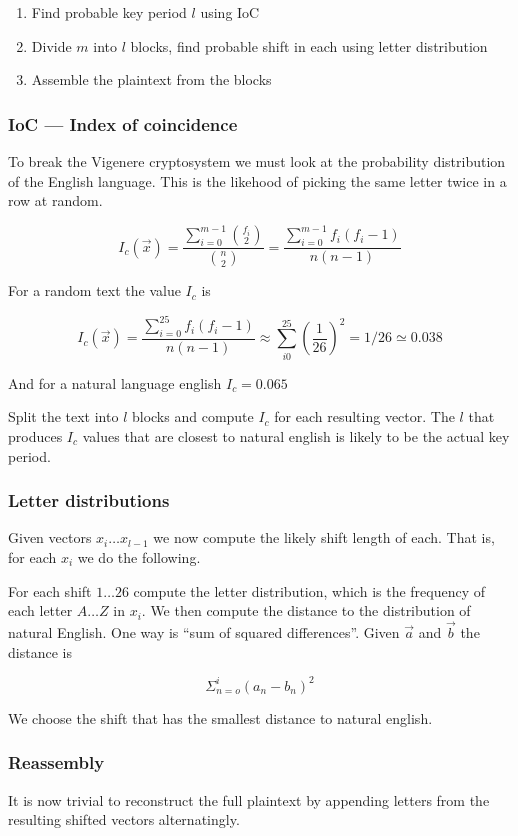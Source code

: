 \begin{enumerate}
\item Find probable key period $l$ using IoC
\item Divide $m$ into $l$ blocks, find probable shift in each using
  letter distribution
\item Assemble the plaintext from the blocks
\end{enumerate}

\subsubsection{IoC --- Index of coincidence}
To break the Vigenere cryptosystem we must look at the probability
distribution of the English language. This is the likehood of picking
the same letter twice in a row at random.

\[ I_c(\vec{x}) =
\frac{\sum^{m-1}_{i=0}\binom{f_i}{2}}{\binom{n}{2}}=
\frac{\sum^{m-1}_{i=0}f_i(f_i - 1)}{n(n-1)}\]

For a random text the value $I_c$ is

\[ I_c(\vec{x}) =
\frac{\sum^{25}_{i=0}f_i(f_i - 1)}{n(n-1)} \approx
\sum^{25}_{i0}(\frac{1}{26})^2= 1/26 \simeq 0.038\]

And for a natural language english $I_c = 0.065$

Split the text into $l$ blocks and compute $I_c$ for each resulting
vector. The $l$ that produces $I_c$ values that are closest to natural
english is likely to be the actual key period.

\subsubsection{Letter distributions}

Given vectors $x_i \ldots x_{l-1}$ we now compute the likely shift
length of each. That is, for each $x_i$ we do the following.

For each shift $1 \ldots 26$ compute the letter distribution, which is
the frequency of each letter $A \ldots Z$ in $x_i$. We then compute
the distance to the distribution of natural English. One way is ``sum
of squared differences''. Given $\overrightarrow{a}$ and
$\overrightarrow{b}$ the distance is

\[\Sigma_{n=o}^i (a_n - b_n)^2 \]

We choose the shift that has the smallest distance to natural english.

\subsubsection{Reassembly}
It is now trivial to reconstruct the full plaintext by appending
letters from the resulting shifted vectors alternatingly.